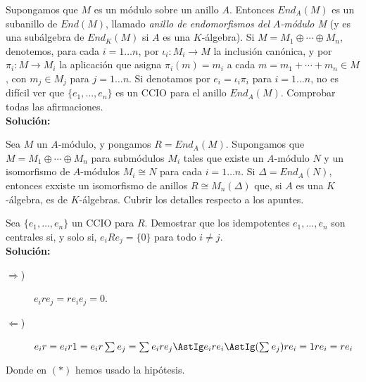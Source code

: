 \begin{ejercicio}
    Supongamos que $M$ es un módulo sobre un anillo $A$. Entonces $End_A(M)$ es un subanillo de $End(M)$, llamado \textit{anillo de endomorfismos del} $A$\textit{-módulo M} (y es una subálgebra de $End_K(M)$ si $A$ es una $K$-álgebra). Si $M = M_1 \oplus \cdots \oplus M_n$, denotemos, para cada $i=1\ldots n$, por $\iota_i:M_i \to M$ la inclusión canónica, y por $\pi_i:M \to M_i $ la aplicación que asigna $\pi_i(m) = m_i $ a cada $m = m_1 + \cdots + m_n \in M$, con $m_j \in M_j$ para $j = 1\ldots n$. Si denotamos por $e_i = \iota_i\pi_i $ para $i=1\ldots n$, no es difícil ver que $\{e_1, \ldots, e_n\}$ es un CCIO para el anillo $End_A(M)$. Comprobar todas las afirmaciones. \\
    
    \noindent
    \textbf{Solución:}
    
\end{ejercicio}

\begin{ejercicio}
    Sea $M$ un $A$-módulo, y pongamos $R=End_A(M)$. Supongamos que $M=M_1 \oplus \cdots \oplus M_n$ para submódulos $M_i $ tales que existe un $A$-módulo $N$ y un isomorfismo de $A$-módulos $M_i \cong N$ para cada $i=1\ldots n$. Si $\Delta = End_A(N)$, entonces exxiste un isomorfismo de anillos $R\cong M_n(\Delta)$ que, si $A$ es una $K$-álgebra, es de $K$-álgebras. Cubrir los detalles respecto a los apuntes. 
\end{ejercicio}

\begin{ejercicio}
    Sea $\{e_1,\ldots,e_n\}$ un CCIO para $R$. Demostrar que los idempotentes $e_1,\ldots,e_n$ son centrales si, y solo si, $e_iRe_j = \{0\}$ para todo $i\neq j$. \\
    
    \noindent
    \textbf{Solución:}
    \begin{description}
        \item [$\Longrightarrow$)] $e_ire_j = re_ie_j = 0$.
        \item [$\Longleftarrow$)] $e_ir = e_ir1= e_ir\sum_{}^{}e_j = \sum_{}^{}e_ire_j \AstIg e_ire_i \AstIg (\sum_{}^{}e_j)re_i = 1re_i = re_i$
    \end{description}
    Donde en $(\ast)$ hemos usado la hipótesis.
\end{ejercicio}

